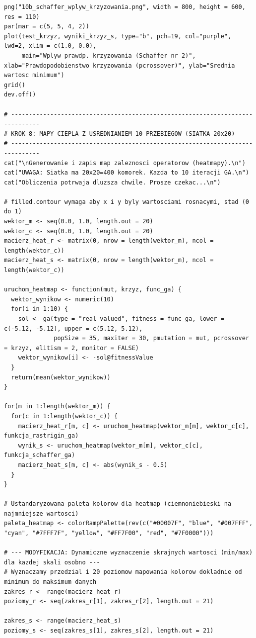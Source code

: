 \documentclass[a4paper,12pt]{article}
\begin{document}
\begin{lstlisting}
png("10b_schaffer_wplyw_krzyzowania.png", width = 800, height = 600, res = 110)
par(mar = c(5, 5, 4, 2))
plot(test_krzyz, wyniki_krzyz_s, type="b", pch=19, col="purple", lwd=2, xlim = c(1.0, 0.0),
     main="Wplyw prawdp. krzyzowania (Schaffer nr 2)", xlab="Prawdopodobienstwo krzyzowania (pcrossover)", ylab="Srednia wartosc minimum")
grid()
dev.off()

# ------------------------------------------------------------------------------
# KROK 8: MAPY CIEPLA Z USREDNIANIEM 10 PRZEBIEGOW (SIATKA 20x20)
# ------------------------------------------------------------------------------
cat("\nGenerowanie i zapis map zaleznosci operatorow (heatmapy).\n")
cat("UWAGA: Siatka ma 20x20=400 komorek. Kazda to 10 iteracji GA.\n")
cat("Obliczenia potrwaja dluzsza chwile. Prosze czekac...\n")

# filled.contour wymaga aby x i y byly wartosciami rosnacymi, stad (0 do 1)
wektor_m <- seq(0.0, 1.0, length.out = 20)
wektor_c <- seq(0.0, 1.0, length.out = 20)
macierz_heat_r <- matrix(0, nrow = length(wektor_m), ncol = length(wektor_c))
macierz_heat_s <- matrix(0, nrow = length(wektor_m), ncol = length(wektor_c))

uruchom_heatmap <- function(mut, krzyz, func_ga) {
  wektor_wynikow <- numeric(10)
  for(i in 1:10) {
    sol <- ga(type = "real-valued", fitness = func_ga, lower = c(-5.12, -5.12), upper = c(5.12, 5.12),
              popSize = 35, maxiter = 30, pmutation = mut, pcrossover = krzyz, elitism = 2, monitor = FALSE)
    wektor_wynikow[i] <- -sol@fitnessValue
  }
  return(mean(wektor_wynikow))
}

for(m in 1:length(wektor_m)) {
  for(c in 1:length(wektor_c)) {
    macierz_heat_r[m, c] <- uruchom_heatmap(wektor_m[m], wektor_c[c], funkcja_rastrigin_ga)
    wynik_s <- uruchom_heatmap(wektor_m[m], wektor_c[c], funkcja_schaffer_ga)
    macierz_heat_s[m, c] <- abs(wynik_s - 0.5) 
  }
}

# Ustandaryzowana paleta kolorow dla heatmap (ciemnoniebieski na najmniejsze wartosci)
paleta_heatmap <- colorRampPalette(rev(c("#00007F", "blue", "#007FFF", "cyan", "#7FFF7F", "yellow", "#FF7F00", "red", "#7F0000")))

# --- MODYFIKACJA: Dynamiczne wyznaczenie skrajnych wartosci (min/max) dla kazdej skali osobno ---
# Wyznaczamy przedzial i 20 poziomow mapowania kolorow dokladnie od minimum do maksimum danych
zakres_r <- range(macierz_heat_r)
poziomy_r <- seq(zakres_r[1], zakres_r[2], length.out = 21)

zakres_s <- range(macierz_heat_s)
poziomy_s <- seq(zakres_s[1], zakres_s[2], length.out = 21)



\end{lstlisting}
\end{document}
